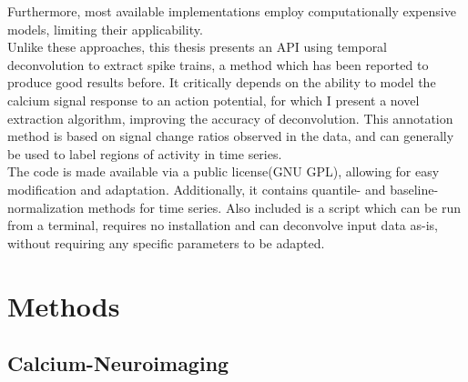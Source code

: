 \documentclass[titlepage]{article}
\begin{document}
Furthermore, most available implementations employ computationally expensive models, limiting their applicability.\\
Unlike these approaches, this thesis presents an API using temporal deconvolution to extract spike trains, a method which has been reported to produce good results before\cite{yaksi_reconstruction_2006}. It critically depends on the ability to model the calcium signal response to an action potential, for which I present a novel extraction algorithm, improving the accuracy of deconvolution. This annotation method is based on signal change ratios observed in the data, and can generally be used to label regions of activity in  time series.\\
The code is made available via a public license(GNU GPL), allowing for easy modification and adaptation. Additionally, it contains quantile- and baseline-normalization methods for time series.
Also included is a script which can be run from a terminal, requires no installation and can deconvolve input data as-is, without requiring any specific parameters to be adapted.
\section{Methods}
\subsection{Calcium-Neuroimaging}
\end{document}
